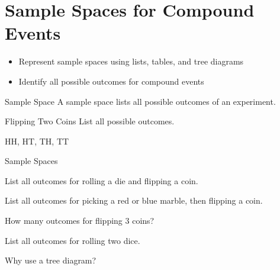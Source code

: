 \section{Sample Spaces for Compound Events}

\begin{learningGoals}
\begin{itemize}
    \item Represent sample spaces using lists, tables, and tree diagrams
    \item Identify all possible outcomes for compound events
\end{itemize}
\end{learningGoals}

\begin{conceptBox}{Sample Space}
A sample space lists all possible outcomes of an experiment.
\end{conceptBox}

\begin{workedExample}{Flipping Two Coins}
List all possible outcomes.

HH, HT, TH, TT
\end{workedExample}


\begin{practiceBox}{Sample Spaces}
\resetProblems

\prob List all outcomes for rolling a die and flipping a coin.

\prob List all outcomes for picking a red or blue marble, then flipping a coin.

\prob How many outcomes for flipping $3$ coins?

\prob List all outcomes for rolling two dice.

\prob Why use a tree diagram?

\end{practiceBox}
